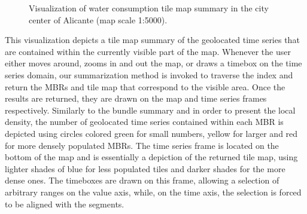 \begin{figure}[ht]
 \centering
 \caption{Visualization of water consumption tile map summary in the city center of Alicante (map scale 1:5000).}
 \vspace{-7.5pt}
 \label{fig:alicante_example2}
\end{figure}


\label{subsubsec:tilemap_sum_vis}
This visualization depicts a tile map summary of the geolocated time series that are contained within the currently visible part of the map. Whenever the user either moves around, zooms in and out the map, or draws a timebox on the time series domain, our summarization method is invoked to traverse the \hisax index and return the MBRs and tile map that correspond to the visible area. Once the results are returned, they are drawn on the map and time series frames respectively. Similarly to the bundle summary and in order to present the local density, the number of geolocated time series contained within each MBR is depicted using circles colored green for small numbers, yellow for larger and red for more densely populated MBRs. The time series frame is located on the bottom of the map and is essentially a depiction of the returned tile map, using lighter shades of blue for less populated tiles and darker shades for the more dense ones. The timeboxes are drawn on this frame, allowing a selection of arbitrary ranges on the value axis, while, on the time axis, the selection is forced to be aligned with the \isax segments.


